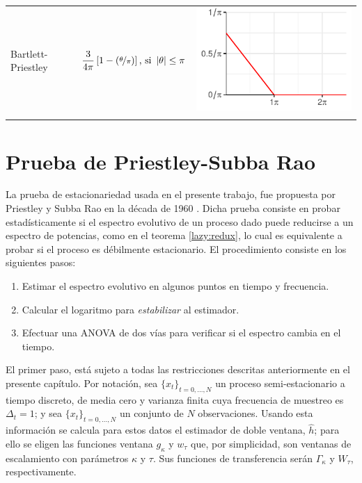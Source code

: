 \documentclass[12pt,letterpaper]{book}
\newcommand{\abso}[1]{\left| #1 \right|}
\newcommand{\xtd}{$\{x_t\}_{t=0,\dots,N}$ }
\newcommand{\bottomrulec}{%
  \arrayrulecolor{black}
  \arrayrulecolor{gris}\specialrule{\belowrulesep}{0pt}{0pt}
  \arrayrulecolor{black}\specialrule{\lightrulewidth}{0pt}{\belowrulesep}
}
\begin{document}
\begin{table}
\begin{small}
\begin{tabular}{lll}
\rowcolor{gris}
Bartlett-Priestley &
$\displaystyle 
\frac{3}{4 \pi} \left[ 1 - \left( \nicefrac{\theta}{\pi} \right) \right]
\text{, si } \abso{\theta}\leq \pi
$
& \includegraphics[scale=.4]{./img_ventanas/ventana_2_bartlet_priestley.pdf} \\
\bottomrulec
\end{tabular}
\end{small}
\end{table}


\section{Prueba de Priestley-Subba Rao}
\label{sec:psr}

La prueba de estacionariedad usada en el presente trabajo, fue propuesta por Priestley y Subba Rao en la década de 1960 \cite{Priestley69}.
%
Dicha prueba consiste en probar estadísticamente si el espectro evolutivo de un proceso dado puede reducirse a un espectro de potencias, como en el teorema \ref{lazy:redux}, lo cual es equivalente a probar si el proceso es débilmente estacionario.
%
El procedimiento consiste en los siguientes pasos:
\begin{enumerate}
\item Estimar el espectro evolutivo en algunos puntos en tiempo y frecuencia.
\item Calcular el logaritmo para \textit{estabilizar} al estimador.
\item Efectuar una ANOVA de dos vías para verificar si el espectro cambia en el tiempo.
\end{enumerate}

El primer paso, está sujeto a todas las restricciones descritas anteriormente en el presente capítulo.
%
Por notación, sea \xtd un proceso semi-estacionario a tiempo discreto, de media cero y varianza finita cuya frecuencia de muestreo es $\Delta_t=1$; y sea \xtd un conjunto de $N$ observaciones.
%
Usando esta información se calcula para estos datos el estimador de doble ventana, $\widehat{h}$; para ello se eligen las funciones ventana $g_\kappa$ y $w_\tau$ que, por simplicidad, son ventanas de escalamiento con parámetros $\kappa$ y $\tau$. 
%
Sus funciones de transferencia serán $\Gamma_\kappa$ y $W_\tau$, respectivamente.
\end{document}
